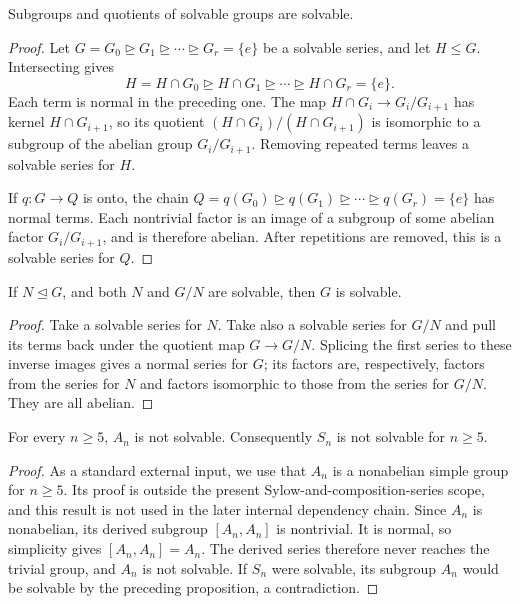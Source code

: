 \begin{proposition}
Subgroups and quotients of solvable groups are solvable.
\end{proposition}
\begin{proof}
Let \(G=G_0\trianglerighteq G_1\trianglerighteq\cdots\trianglerighteq
G_r=\{e\}\) be a solvable series, and let \(H\leq G\).  Intersecting gives
\[
 H=H\cap G_0\trianglerighteq H\cap G_1\trianglerighteq\cdots
 \trianglerighteq H\cap G_r=\{e\}.
\]
Each term is normal in the preceding one.  The map
\(H\cap G_i\to G_i/G_{i+1}\) has kernel \(H\cap G_{i+1}\), so its quotient
\((H\cap G_i)/(H\cap G_{i+1})\) is isomorphic to a subgroup of the abelian
group \(G_i/G_{i+1}\).  Removing repeated terms leaves a solvable series for
\(H\).

If \(q:G\to Q\) is onto, the chain
\(Q=q(G_0)\trianglerighteq q(G_1)\trianglerighteq\cdots\trianglerighteq
q(G_r)=\{e\}\) has normal terms.  Each nontrivial factor is an image of a
subgroup of some abelian factor \(G_i/G_{i+1}\), and is therefore abelian.
After repetitions are removed, this is a solvable series for \(Q\).
\end{proof}

\begin{proposition}[Extensions]
If \(N\trianglelefteq G\), and both \(N\) and \(G/N\) are solvable, then
\(G\) is solvable.
\end{proposition}
\begin{proof}
Take a solvable series for \(N\).  Take also a solvable series for \(G/N\)
and pull its terms back under the quotient map \(G\to G/N\).  Splicing the
first series to these inverse images gives a normal series for \(G\); its
factors are, respectively, factors from the series for \(N\) and factors
isomorphic to those from the series for \(G/N\).  They are all abelian.
\end{proof}

\begin{theorem}
For every \(n\geq5\), \(A_n\) is not solvable. Consequently \(S_n\) is not
solvable for \(n\geq5\).
\end{theorem}
\begin{proof}
As a standard external input, we use that \(A_n\) is a nonabelian simple
group for \(n\geq5\). Its proof is outside the present
Sylow-and-composition-series scope, and this result is not used in the later
internal dependency chain. Since \(A_n\) is nonabelian, its derived subgroup
\([A_n,A_n]\) is
nontrivial. It is normal, so simplicity gives
\([A_n,A_n]=A_n\). The derived series therefore never reaches the trivial
group, and \(A_n\) is not solvable. If \(S_n\) were solvable, its subgroup
\(A_n\) would be solvable by the preceding proposition, a contradiction.
\end{proof}

